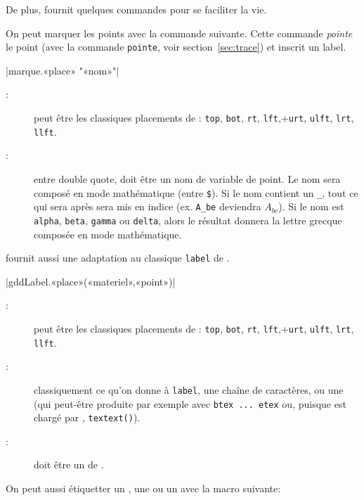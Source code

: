 \documentclass[a4paper,french]{article}
\begin{document}
De plus, \mpgeomdd fournit quelques commandes pour se faciliter la vie.

On peut marquer les points avec la commande suivante. Cette commande
\emph{pointe} le point (avec la commande \lstinline+pointe+, voir
section~\ref{sec:trace}) et inscrit un label.
\begin{colourband}
\macro|marque.«place» "«nom»"|
\begin{description}
  \item[:] peut être les classiques placements de \MP{} :
  \lstinline+top+, \lstinline+bot+, \lstinline+rt+,
  \lstinline+lft+,+\lstinline+urt+, \lstinline+ulft+, \lstinline+lrt+, \lstinline+llft+.
  \item[:] entre double quote, doit être un nom de variable de
  point. Le nom sera composé en mode mathématique (entre \lstinline+$+). Si le
  nom contient un \lstinline+_+, tout ce qui sera après sera mis en
  indice (ex. \lstinline+A_be+ deviendra $A_{be}$). Si le nom est
  \lstinline+alpha+, \lstinline+beta+, \lstinline+gamma+ ou \lstinline+delta+,
  alors le résultat donnera la lettre grecque composée en mode mathématique.
\end{description}
\end{colourband}


\mpgeomdd fournit aussi une adaptation au classique \lstinline+label+ de \MP{}.

\begin{colourband}
\macro|gddLabel.«place»(«materiel»,«point»)|
\begin{description}
  \item[:] peut être les classiques placements de \MP{} :
  \lstinline+top+, \lstinline+bot+, \lstinline+rt+,
  \lstinline+lft+,+\lstinline+urt+, \lstinline+ulft+, \lstinline+lrt+, \lstinline+llft+.
  \item[:] classiquement ce qu'on donne à \lstinline+label+, une
  chaîne de caractères, ou une  (qui peut-être produite par
  exemple avec \lstinline+btex ... etex+ ou, puisque  est
  chargé par \mpgeomdd, \lstinline+textext()+).
  \item[:] doit être un  de \mpgeomdd.
\end{description}
\end{colourband}

On peut aussi étiquetter un , une  ou un
 avec la macro suivante:
\end{document}
